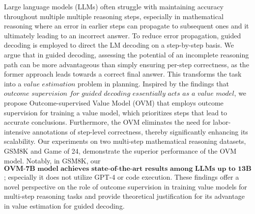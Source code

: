 Large language models (LLMs) often struggle with maintaining accuracy throughout multiple multiple reasoning steps, especially in mathematical reasoning where an error in earlier steps can propagate to subsequent ones and it ultimately leading to an incorrect answer. To reduce error propagation, guided decoding is employed to direct the LM decoding on a step-by-step basis. We argue that in guided decoding, assessing the potential of an incomplete reasoning path can be more advantageous than simply ensuring per-step correctness, as the former approach leads towards a correct final answer. This transforms the task into a $\textit{value estimation}$ problem in planning. Inspired by the findings that $\textit{outcome supervision for guided decoding essentially acts as a value model}$, we propose Outcome-supervised Value Model (OVM) that employs outcome supervision for training a value model, which prioritizes steps that lead to accurate conclusions. Furthermore, the OVM eliminates the need for labor-intensive annotations of step-level correctness, thereby significantly enhancing its scalability. Our experiments on two multi-step mathematical reasoning datasets, GSM8K and Game of 24, demonstrate the superior performance of the OVM model. Notably, in GSM8K, our $\textbf{OVM-7B model achieves state-of-the-art results among LLMs up to  13B parameters}$; especially it does not utilize GPT-4 or code execution. These findings offer a novel perspective on the role of outcome supervision in training value models for multi-step reasoning tasks and provide theoretical justification for its advantage in value estimation for guided decoding.